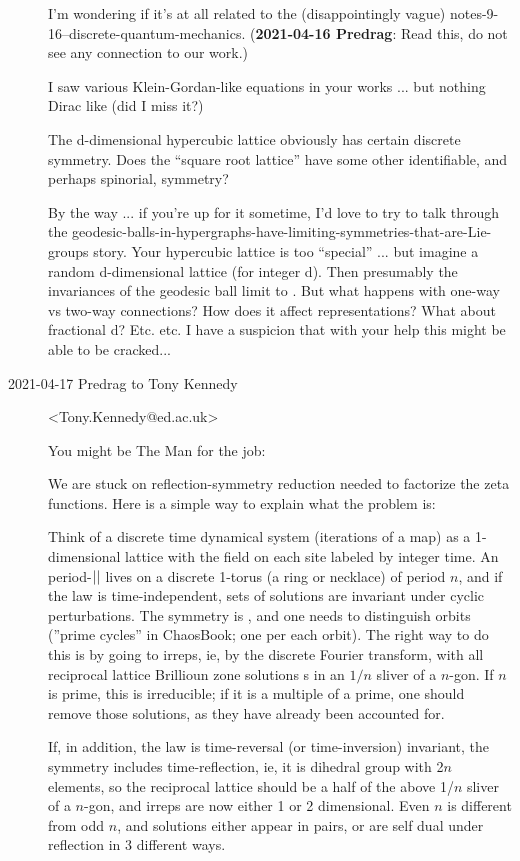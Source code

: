 \begin{description}
I'm wondering if it's at all related to the (disappointingly vague)
{notes-9-16--discrete-quantum-mechanics}.
({\bf 2021-04-16 Predrag}: Read this, do not see any connection to our work.)

I saw various Klein-Gordan-like equations in your works ... but nothing
Dirac like (did I miss it?)

The d-dimensional hypercubic lattice obviously has certain discrete
symmetry.  Does the ``square root lattice'' have some other identifiable,
and perhaps spinorial, symmetry?

By the way ... if you're up for it sometime, I'd love to try to talk
through the
geodesic-balls-in-hypergraphs-have-limiting-symmetries-that-are-Lie-groups
story.  Your hypercubic lattice is too ``special'' ... but imagine a random
d-dimensional lattice (for integer d).  Then presumably the invariances
of the geodesic ball limit to .  But what happens with one-way vs
two-way connections?  How does it affect representations?  What about
fractional d?  Etc. etc.    I have a suspicion that with your help this
might be able to be cracked...


    \item[2021-04-17 Predrag to Tony Kennedy] <Tony.Kennedy@ed.ac.uk>

You might be The Man for the job:

We are stuck on reflection-symmetry reduction needed to factorize the
zeta functions. Here is a simple way to explain what the problem is:

Think of a discrete time dynamical system (iterations of a map) as a
1-dimensional lattice with the field on each site labeled by integer
time. An period-${||}$ {\lattstate} lives on a discrete 1-torus (a ring or
necklace) of period $n$, and if the law is time-independent, sets of
solutions are invariant under cyclic perturbations. The symmetry is
, and one needs to distinguish  orbits
(''{prime cycle}s'' in ChaosBook; one per each orbit).
The right way to do this is by going to
 irreps, ie, by the discrete Fourier transform, with all reciprocal
lattice Brillioun zone solutions {\orbit}s in an $1/n$ sliver of a
$n$-gon. If $n$ is prime, this is irreducible; if it is a multiple of a
prime, one should remove those solutions, as they have already been
accounted for.

If, in addition, the law is time-reversal (or time-inversion) invariant,
the symmetry includes time-reflection, ie, it is dihedral group 
with 2$n$ elements, so the reciprocal lattice should be a half of the
above 1/$n$ sliver of a $n$-gon, and irreps are now either 1 or 2
dimensional. Even $n$ is different from odd $n$, and solutions either appear
in pairs, or are self dual under reflection in 3 different ways.


\end{description}
